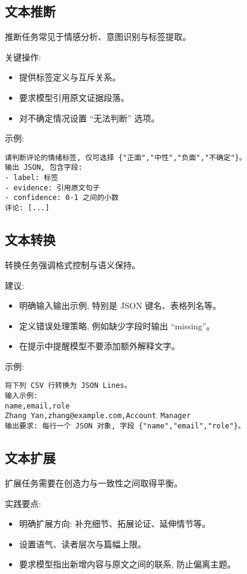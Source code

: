 ﻿\documentclass[12pt]{ctexart}
\begin{document}
\subsection{文本推断}
推断任务常见于情感分析、意图识别与标签提取。

关键操作:
\begin{itemize}[leftmargin=*,itemsep=0.4em]
  \item 提供标签定义与互斥关系。
  \item 要求模型引用原文证据段落。
  \item 对不确定情况设置 ``无法判断'' 选项。
\end{itemize}

示例:\par
\begin{verbatim}
请判断评论的情绪标签, 仅可选择 {"正面","中性","负面","不确定"}。
输出 JSON, 包含字段:
- label: 标签
- evidence: 引用原文句子
- confidence: 0-1 之间的小数
评论: [...]
\end{verbatim}

\subsection{文本转换}
转换任务强调格式控制与语义保持。

建议:
\begin{itemize}[leftmargin=*,itemsep=0.4em]
  \item 明确输入输出示例, 特别是 JSON 键名、表格列名等。
  \item 定义错误处理策略, 例如缺少字段时输出 ``missing''。
  \item 在提示中提醒模型不要添加额外解释文字。
\end{itemize}

示例:\par
\begin{verbatim}
将下列 CSV 行转换为 JSON Lines。
输入示例:
name,email,role
Zhang Yan,zhang@example.com,Account Manager
输出要求: 每行一个 JSON 对象, 字段 {"name","email","role"}。
\end{verbatim}

\subsection{文本扩展}
扩展任务需要在创造力与一致性之间取得平衡。

实践要点:
\begin{itemize}[leftmargin=*,itemsep=0.4em]
  \item 明确扩展方向: 补充细节、拓展论证、延伸情节等。
  \item 设置语气、读者层次与篇幅上限。
  \item 要求模型指出新增内容与原文之间的联系, 防止偏离主题。
\end{itemize}
\end{document}
